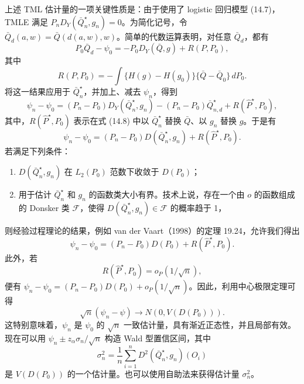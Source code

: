 上述 TML 估计量的一项关键性质是：由于使用了 logistic 回归模型 (14.7)，TMLE 满足 $P_nD_Y(\bar Q_n^\star,g_n)=0$。为简化记号，令 $\bar Q_d(a,w)=\bar Q(d(a,w),w)$。简单的代数运算表明，对任意 $\bar Q_d$，都有
\[
 P_0\bar Q_d-\psi_0=-P_0D_Y(\bar Q,g)+R(P,P_0),
\]
其中
\begin{equation}
 R(P,P_0)=-\int\{H(g)-H(g_0)\}\{\bar Q-\bar Q_0\}\,dP_0.
 \tag{14.8}
\end{equation}
将这一结果应用于 $\bar Q_n^\star$，并加上、减去 $\psi_n$，得到
\[
 \psi_n-\psi_0=(P_n-P_0)D_Y(\bar Q_n^\star,g_n)
 -(P_n-P_0)\bar Q_{n,d}^\star+R(\hat P^\star,P_0),
\]
其中，$R(\hat P^\star,P_0)$ 表示在式 (14.8) 中以 $\bar Q_n^\star$ 替换 $\bar Q$、以 $g_n$ 替换 $g$。于是有
\[
 \psi_n-\psi_0=(P_n-P_0)D(\bar Q_n^\star,g_n)+R(\hat P^\star,P_0).
\]
若满足下列条件：
\begin{enumerate}
 \item $D(\bar Q_n^\star,g_n)$ 在 $L_2(P_0)$ 范数下收敛于 $D(P_0)$；
 \item 用于估计 $\bar Q_n^\star$ 和 $g_n$ 的函数类大小有界。技术上说，存在一个由 $o$ 的函数组成的 Donsker 类 $\mathcal F$，使得 $D(\bar Q_n^\star,g_n)\in\mathcal F$ 的概率趋于 1，
\end{enumerate}
则经验过程理论的结果，例如 van der Vaart（1998）的定理 19.24，允许我们得出
\[
 \psi_n-\psi_0=(P_n-P_0)D(P_0)+R(\hat P^\star,P_0).
\]
此外，若
\begin{equation}
 R(\hat P^\star,P_0)=o_P(1/\sqrt n),
 \tag{14.9}
\end{equation}
便有 $\psi_n-\psi_0=(P_n-P_0)D(P_0)+o_P(1/\sqrt n)$。因此，利用中心极限定理可得
\[
 \sqrt n(\psi_n-\psi)\longrightarrow N(0,V(D(P_0))).
\]
这特别意味着，$\psi_n$ 是 $\psi_0$ 的 $\sqrt n$ 一致估计量，具有渐近正态性，并且局部有效。现在可以用 $\psi_n\pm z_\alpha\sigma_n/\sqrt n$ 构造 Wald 型置信区间，其中
\[
 \sigma_n^2=\frac1n\sum_{i=1}^nD^2(\bar Q_n^\star,g_n)(O_i)
\]
是 $V(D(P_0))$ 的一个估计量。也可以使用自助法来获得估计量 $\sigma_n^2$。

